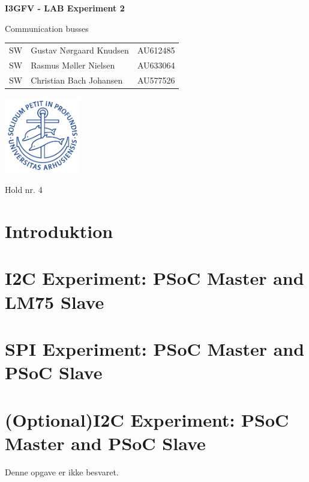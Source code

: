 \documentclass{article}
\begin{document}

\begin{titlepage}
    
  \begin{center}
    \vspace*{1cm}

    \Huge
    \textbf{I3GFV - LAB Experiment 2}

    \vspace{0.5cm}
    \huge
    Communication busses \\
    \date\today

    \vspace{3cm}

    \Large
    \begin{tabular}{l|l|r}
      SW & Gustav Nørgaard Knudsen & AU612485 \\
      SW & Rasmus Møller Nielsen & AU633064\\
      SW & Christian Bach Johansen & AU577526 \\
    \end{tabular}
    \vfill
    \includegraphics[width=0.25\textwidth]{au2}
    \vspace{2cm}

      Hold nr. 4

  \end{center}
\end{titlepage}

\newpage

\tableofcontents

\newpage

\setcounter{page}{1}


\section{Introduktion}

\section{I2C Experiment: PSoC Master and LM75 Slave}



\section{SPI Experiment: PSoC Master and PSoC Slave}



\section{(Optional)I2C Experiment: PSoC Master and PSoC Slave }
Denne opgave er ikke besvaret.
\end{document}

